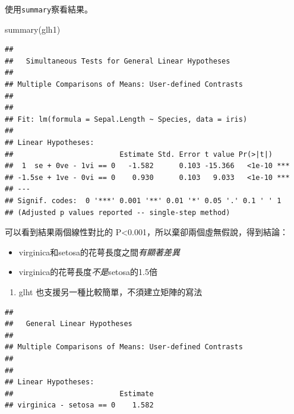 \documentclass[
]{book}
\newenvironment{Shaded}{\begin{snugshade}}{\end{snugshade}}
\newcommand{\AttributeTok}[1]{\textcolor[rgb]{0.77,0.63,0.00}{#1}}
\newcommand{\CommentTok}[1]{\textcolor[rgb]{0.56,0.35,0.01}{\textit{#1}}}
\newcommand{\FunctionTok}[1]{\textcolor[rgb]{0.00,0.00,0.00}{#1}}
\newcommand{\NormalTok}[1]{#1}
\newcommand{\StringTok}[1]{\textcolor[rgb]{0.31,0.60,0.02}{#1}}
\providecommand{\tightlist}{%
  \setlength{\itemsep}{0pt}\setlength{\parskip}{0pt}}
\begin{document}
使用\texttt{summary}察看結果。

\begin{Shaded}
\begin{Highlighting}[]
\FunctionTok{summary}\NormalTok{(glh1)}
\end{Highlighting}
\end{Shaded}

\begin{verbatim}
## 
##   Simultaneous Tests for General Linear Hypotheses
## 
## Multiple Comparisons of Means: User-defined Contrasts
## 
## 
## Fit: lm(formula = Sepal.Length ~ Species, data = iris)
## 
## Linear Hypotheses:
##                         Estimate Std. Error t value Pr(>|t|)    
##  1  se + 0ve - 1vi == 0   -1.582      0.103 -15.366   <1e-10 ***
## -1.5se + 1ve - 0vi == 0    0.930      0.103   9.033   <1e-10 ***
## ---
## Signif. codes:  0 '***' 0.001 '**' 0.01 '*' 0.05 '.' 0.1 ' ' 1
## (Adjusted p values reported -- single-step method)
\end{verbatim}

可以看到結果兩個線性對比的 P\textless0.001，所以棄卻兩個虛無假說，得到結論：

\begin{itemize}
\tightlist
\item
  virginica和setosa的花萼長度之間\emph{有顯著差異}
\item
  virginica的花萼長度\emph{不是}setosa的1.5倍
\end{itemize}

\begin{enumerate}
\def\labelenumi{\arabic{enumi}.}
\setcounter{enumi}{2}
\tightlist
\item
  glht 也支援另一種比較簡單，不須建立矩陣的寫法
\end{enumerate}

\begin{Shaded}
\end{Shaded}

\begin{verbatim}
## 
##   General Linear Hypotheses
## 
## Multiple Comparisons of Means: User-defined Contrasts
## 
## 
## Linear Hypotheses:
##                         Estimate
## virginica - setosa == 0    1.582
\end{verbatim}
\end{document}
